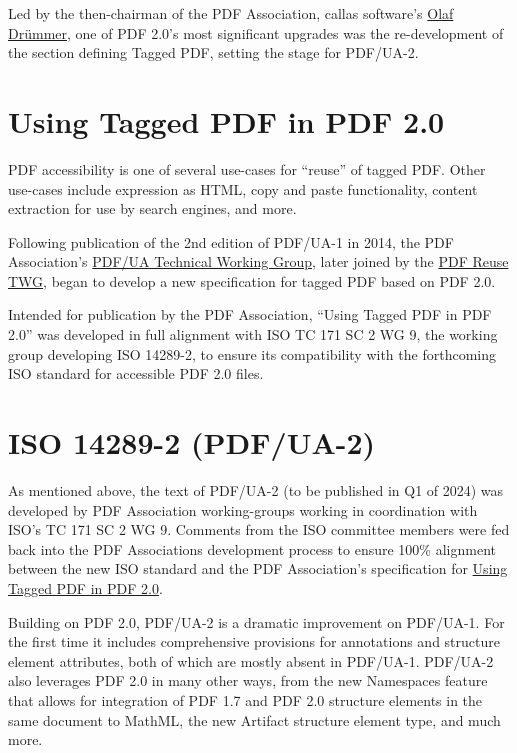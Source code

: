 \documentclass[12pt,a4paper]{article}
\begin{document}
Led by the then-chairman of the PDF Association, callas software's
\href{https://pdfa.org/people/olaf-drummer/}{Olaf Drümmer}, one of PDF
2.0's most significant upgrades was the re-development of the section
defining Tagged PDF, setting the stage for PDF/UA-2.

\section{Using Tagged PDF in PDF 2.0}\label{using-tagged-pdf-in-pdf-2.0}

PDF accessibility is one of several use-cases for ``reuse'' of tagged
PDF. Other use-cases include expression as HTML, copy and paste
functionality, content extraction for use by search engines, and more.

Following publication of the 2nd edition of PDF/UA-1 in 2014, the PDF
Association's
\href{https://pdfa.org/community/pdf-ua-technical-working-group/}{PDF/UA
Technical Working Group}, later joined by the
\href{https://pdfa.org/community/pdf-reuse-twg/}{PDF Reuse TWG}, began
to develop a new specification for tagged PDF based on PDF 2.0.

Intended for publication by the PDF Association, \enquote{Using Tagged PDF in
PDF 2.0} was developed in full alignment with ISO TC 171 SC 2 WG 9, the
working group developing ISO 14289-2, to ensure its compatibility with
the forthcoming ISO standard for accessible PDF 2.0 files.

\section{ISO 14289-2 (PDF/UA-2)}\label{iso-14289-2-pdfua-2}

As mentioned above, the text of PDF/UA-2 (to be published in Q1 of 2024)
was developed by PDF Association working-groups working in coordination
with ISO's TC 171 SC 2 WG 9. Comments from the ISO committee members
were fed back into the PDF Association\textquotesingle s development
process to ensure 100\% alignment between the new ISO standard and the
PDF Association's specification for \hyperref[using-tagged-pdf-in-pdf-2.0]{Using
Tagged PDF in PDF 2.0}.

Building on PDF 2.0, PDF/UA-2 is a dramatic improvement on PDF/UA-1. For
the first time it includes comprehensive provisions for annotations and
structure element attributes, both of which are mostly absent in
PDF/UA-1. PDF/UA-2 also leverages PDF 2.0 in many other ways, from the
new Namespaces feature that allows for integration of PDF 1.7 and PDF
2.0 structure elements in the same document to MathML, the new Artifact
structure element type, and much more.
\end{document}
